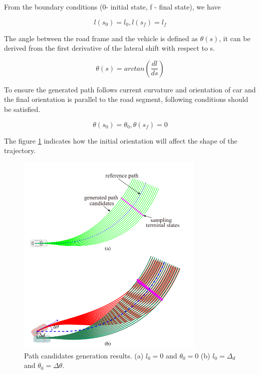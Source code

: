 From the boundary conditions (0- initial state, f - final state), we have

\begin{equation}
l(s_0) = l_0 , l(s_f ) = l_f
\label{lat_boudary}
\end{equation}

The angle between the road frame and the vehicle is defined as $\theta(s)$, it can be derived from the first derivative of the lateral shift with respect to s. 

\begin{equation}
\theta(s) = arctan(\frac{dl}{ds})
\label{lat_veh_theta}
\end{equation}

To ensure the generated path follows current curvature and orientation of car and the final orientation is parallel to the road segment, following conditions should be satisfied.


\begin{equation}
\theta(s_0) = \theta_0 , \theta(s_f) = 0
\label{th_bundary}
\end{equation}

The figure \ref{lat_planning} indicates how the initial orientation will affect the shape of the trajectory. 

 \begin{figure}[H]
    \centering
    \includegraphics[width=0.8\textwidth]{Images/lateral_planning.png}
    \caption{Path candidates generation results. (a) $l_0 = 0$ and $\theta_0 = 0$ (b) $ 
l_0 = \Delta_d$ and $ \theta_0 = \Delta\theta$. \cite{real_time_traj_plan_article}}
    \label{lat_planning}
\end{figure}

